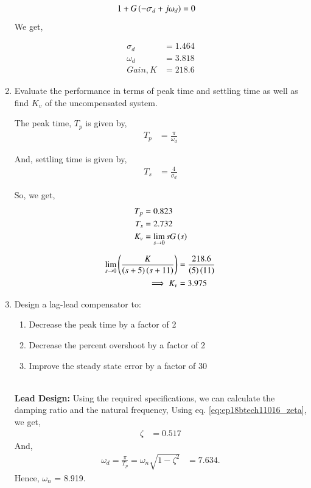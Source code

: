 \begin{enumerate}[label=\thesection.\arabic*.,ref=\thesection.\theenumi]
\begin{align}
    1 + G\left(-\sigma_d + j\omega_d\right) &= 0
\end{align}
We get, 

\begin{align}
    \sigma_d &= 1.464\\
    \omega_d &= 3.818\\
    Gain, K &= 218.6
\end{align}


\item Evaluate the performance in terms of peak time and settling time as well as find $K_v$ of the uncompensated system.\\

\solution

The peak time, $T_p$ is given by,
\begin{align}
    T_p &= \frac{\pi}{\omega_d}
\end{align}

And, settling time is given by,
\begin{align}
    T_s &= \frac{4}{\sigma_d}
\end{align}

So, we get,
\begin{align}
    T_p &= 0.823\\
    T_s &= 2.732\\
    K_v &= \lim_{s \to 0} s G\left(s\right)
\end{align}

\begin{align}
    \lim_{s \to 0} \left(\frac{K}{\left(s+5\right)\left(s+11\right)}\right) &= \frac{218.6}{\left(5\right)\left(11\right)}\\
    \implies K_v &= 3.975
\end{align}


\item Design a lag-lead compensator to:
\begin{enumerate}
    \item Decrease the peak time by a factor of 2
    \item Decrease the percent overshoot by a factor of 2
    \item Improve the steady state error by a factor  of 30
\end{enumerate}

\solution\\
\textbf{Lead Design:}
Using the required specifications, we can calculate the damping ratio and the natural frequency,
Using eq. \ref{eq:ep18btech11016_zeta}, we get,
\begin{align}
    \zeta &= 0.517
\end{align}
And,
\begin{align}
    \omega_d = \frac{\pi}{T_p} = \omega_n\sqrt{1-\zeta^2} &= 7.634.
\end{align}
Hence, $\omega_n$ = 8.919.


\end{enumerate}
